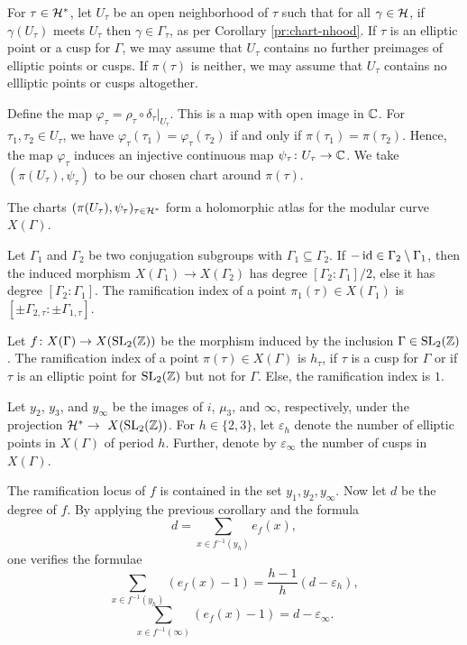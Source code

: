 For $\tau\in\mathcal{H}^*$, let $U_\tau$ be an open neighborhood of $\tau$ such that for all $\gamma\in\mathcal{H}$, if $\gamma(U_\tau)$ meets $U_\tau$ then $\gamma\in\Gamma_\tau$, as per Corollary \ref{pr:chart-nhood}. If $\tau$ is an elliptic point or a cusp for $\Gamma$, we may assume that $U_\tau$ contains no further preimages of elliptic points or cusps. If $\pi(\tau)$ is neither, we may assume that $U_\tau$ contains no ellliptic points or cusps altogether.

Define the map $\varphi_\tau=\rho_\tau\circ\delta_\tau|_{U_\tau}$. This is a map with open image in $\mathbb{C}$. For $\tau_1,\tau_2\in U_\tau$, we have $\varphi_\tau(\tau_1)=\varphi_\tau(\tau_2)$ if and only if $\pi(\tau_1)=\pi(\tau_2)$. Hence, the map $\varphi_\tau$ induces an injective continuous map $\psi_\tau\colon U_\tau\to\mathbb{C}$. We take $(\pi(U_\tau),\psi_\tau)$ to be our chosen chart around $\pi(\tau)$.

\begin{prop} \label{pr:charts}
 The charts $(\pi(U_\tau),\psi_\tau)_{\tau\in\mathcal{H}^*}$ form a holomorphic atlas for the modular curve $X(\Gamma)$.
\end{prop}

\begin{prop}
 Let $\Gamma_1$ and $\Gamma_2$ be two conjugation subgroups with $\Gamma_1\subseteq\Gamma_2$. If $-\operatorname{id}\in\Gamma_2\setminus\Gamma_1$, then the induced morphism $X(\Gamma_1)\to X(\Gamma_2)$ has degree $[\Gamma_2:\Gamma_1]/2$, else it has degree $[\Gamma_2:\Gamma_1]$. The ramification index of a point $\pi_1(\tau)\in X(\Gamma_1)$ is $[\pm\Gamma_{2,\tau}:\pm\Gamma_{1,\tau}]$.
\end{prop}

\begin{cor}
 Let $f\colon X(\Gamma)\to X(\operatorname{SL}_2(\mathbb{Z}))$ be the morphism induced by the inclusion $\Gamma\in\operatorname{SL}_2(\mathbb{Z})$. The ramification index of a point $\pi(\tau)\in X(\Gamma)$ is $h_\tau$, if $\tau$ is a cusp for $\Gamma$ or if $\tau$ is an elliptic point for $\operatorname{SL}_2(\mathbb{Z})$ but not for $\Gamma$. Else, the ramification index is $1$.
\end{cor}

Let $y_2$, $y_3$, and $y_\infty$ be the images of $i$, $\mu_3$, and $\infty$, respectively, under the projection $\mathcal{H}^*\to\ X(\operatorname{SL}_2(\mathbb{Z}))$. For $h\in\{2,3\}$, let $\varepsilon_h$ denote the number of elliptic points in $X(\Gamma)$ of period $h$. Further, denote by $\varepsilon_\infty$ the number of cusps in $X(\Gamma)$.

The ramification locus of $f$ is contained in the set ${y_1,y_2,y_\infty}$. Now let $d$ be the degree of $f$. By applying the previous corollary and the formula 
\[d=\sum_{x\in f^{-1}(y_h)}e_f(x),\] one verifies the formulae
\[\sum_{x\in f^{-1}(y_h)}(e_f(x)-1)=\frac{h-1}{h}(d-\varepsilon_h),\]
\[\sum_{x\in f^{-1}(\infty)}(e_f(x)-1)=d-\varepsilon_\infty.\]

